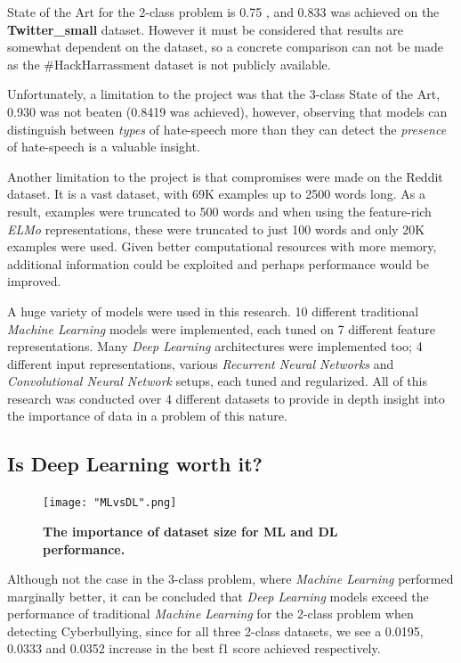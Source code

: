 \documentclass[12pt,a4paper]{article}
\begin{document}
State of the Art for the 2-class problem is 0.75 \cite{Hack}, and 0.833 was achieved on the \textbf{Twitter\_small} dataset. However it must be considered that results are somewhat dependent on the dataset, so a concrete comparison can not be made as the \#HackHarrassment dataset is not publicly available. 

Unfortunately, a limitation to the project was that the 3-class State of the Art, 0.930 \cite{Badjatiya} was not beaten (0.8419 was achieved), however, observing that models can distinguish between \textit{types} of hate-speech more than they can detect the \textit{presence} of hate-speech is a valuable insight.

Another limitation to the project is that compromises were made on the Reddit dataset. It is a vast dataset, with 69K examples up to 2500 words long. As a result, examples were truncated to 500 words and when using the feature-rich \textit{ELMo} representations, these were truncated to just 100 words and only 20K examples were used. Given better computational resources with more memory, additional information could be exploited and perhaps performance would be improved. 

A huge variety of models were used in this research. 10 different traditional \textit{Machine Learning} models were implemented, each tuned on 7 different feature representations. Many \textit{Deep Learning} architectures were implemented too; 4 different input representations, various \textit{Recurrent Neural Networks} and \textit{Convolutional Neural Network} setups, each tuned and regularized. All of this research was conducted over 4 different datasets to provide in depth insight into the importance of data in a problem of this nature. 


\subsection{Is Deep Learning worth it?}
\begin{figure}
	\centering
	\vspace{-30pt}
	\texttt{[image: "MLvsDL".png]} 
	\caption{\textbf{The importance of dataset size for ML and DL performance.}}
	\label{MLvsDL}
\end{figure}

Although not the case in the 3-class problem, where \textit{Machine Learning} performed marginally better, it can be concluded that \textit{Deep Learning} models exceed the performance of traditional \textit{Machine Learning} for the 2-class problem when detecting Cyberbullying, since for all three 2-class datasets, we see a 0.0195, 0.0333 and 0.0352 increase in the best f1 score achieved respectively. 
\end{document}
